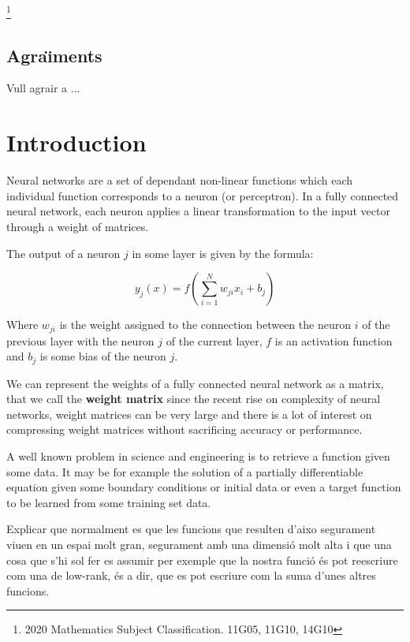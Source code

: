 \documentclass[11pt,a4paper,openright,oneside]{book}
\numberwithin{equation}{section}
\begin{document}
{\let\thefootnote\relax\footnote{2020 Mathematics Subject Classification. 11G05, 11G10, 14G10}}



\newpage 


\section*{Agra\"{\i}ments}

Vull agrair a ... 
\newpage

{\hypersetup{linkcolor=black}
\tableofcontents
}

\newpage

\setcounter{page}{1}
\chapter{Introduction}

Neural networks are a set of dependant non-linear functions which each individual function corresponds to 
a neuron (or perceptron). In a fully connected neural network, each neuron applies a linear transformation
to the input vector through a weight of matrices.

The output of a neuron $j$ in some layer is given by the formula:

$$ y_j(x) = f\left(\sum_{i=1}^N w_{ji} x_i + b_{j}\right) $$ 

Where $w_{ji}$ is the weight assigned to the connection between the neuron $i$ of the previous layer with the neuron
$j$ of the current layer, $f$ is an activation function and $b_j$ is some bias of the neuron $j$.

We can represent the weights of a fully connected neural network as a matrix, that we call the \textbf{weight matrix}
since the recent rise on complexity of neural networks, weight matrices can be very large and there is a lot of
interest on compressing weight matrices without sacrificing accuracy or performance.



A well known problem in science and engineering is to retrieve a function given some data. It may be
for example the solution of a partially differentiable equation given some boundary conditions or initial data or
even a target function to be learned from some training set data. \cite{yeTensorNetworkRanks2019}

Explicar que normalment es que les funcions que resulten d'aixo segurament viuen en un espai molt gran, segurament
amb una dimensió molt alta i que una cosa
que s'hi sol fer es assumir per exemple que la nostra funció és pot reescriure com una de low-rank, és a dir, que es pot escriure com la suma
d'unes altres funcions.
\end{document}
